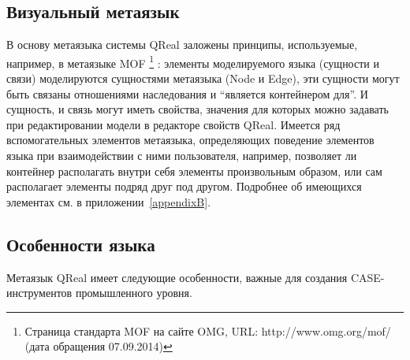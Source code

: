 \subsection{Визуальный метаязык}
В основу метаязыка системы QReal заложены принципы, используемые, например, в метаязыке MOF%
\footnote{Страница стандарта MOF на сайте OMG, URL: http://www.omg.org/mof/ (дата обращения 07.09.2014)}%
: элементы моделируемого языка (сущности и связи) моделируются сущностями метаязыка 
(Node и Edge), эти сущности могут быть связаны отношениями наследования и "`является контейнером для"'. 
И сущность, и связь могут иметь свойства, значения для которых можно задавать при 
редактировании модели в редакторе свойств QReal. Имеется ряд вспомогательных элементов 
метаязыка, определяющих поведение элементов языка при взаимодействии с ними пользователя, 
например, позволяет ли контейнер располагать внутри себя элементы произвольным образом, 
или сам располагает элементы подряд друг под другом. Подробнее об имеющихся элементах 
см. в приложении~\ref{appendixB}.

\subsection{Особенности языка}
Метаязык QReal имеет следующие особенности, важные для создания CASE-инструментов 
промышленного уровня.

